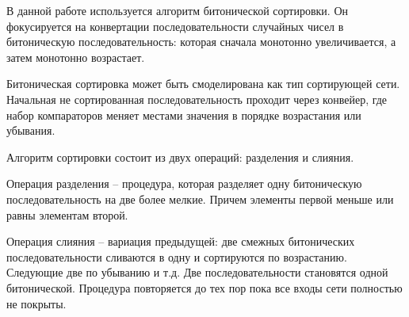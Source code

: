 В данной работе используется алгоритм битонической сортировки. Он фокусируется на конвертации
последовательности случайных чисел в битоническую последовательность: которая сначала
монотонно увеличивается, а затем монотонно возрастает.

Битоническая сортировка может быть смоделирована как тип сортирующей сети. Начальная
не сортированная последовательность проходит через конвейер, где набор компараторов 
меняет местами значения в порядке возрастания или убывания.

Алгоритм сортировки состоит из двух операций: разделения и слияния.

Операция разделения -- процедура, которая разделяет одну битоническую последовательность на
две более мелкие. Причем элементы первой меньше или равны элементам второй.

Операция слияния -- вариация предыдущей: две смежных битонических последовательности
сливаются в одну и сортируются по возрастанию. Следующие две по убыванию и т.д. 
Две последовательности становятся одной битонической. Процедура повторяется до тех пор пока 
все входы сети полностью не покрыты. 
